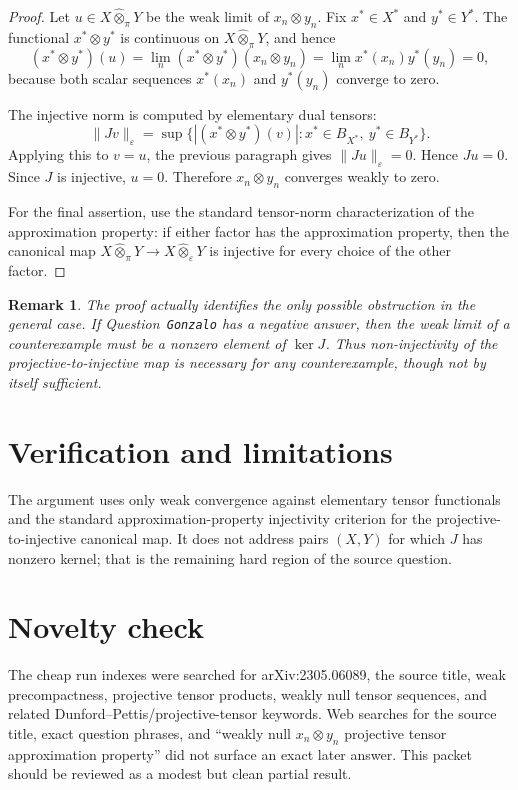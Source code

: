 \documentclass[11pt]{article}
\newtheorem{remark}{Remark}
\newcommand{\pten}{\widehat{\otimes}_{\pi}}
\newcommand{\eten}{\widehat{\otimes}_{\varepsilon}}
\begin{document}
\begin{proof}
Let \(u\in X\pten Y\) be the weak limit of \(x_n\otimes y_n\).  Fix \(x^*\in X^*\) and \(y^*\in Y^*\).  The functional \(x^*\otimes y^*\) is continuous on \(X\pten Y\), and hence
\[
  (x^*\otimes y^*)(u)
  =\lim_n (x^*\otimes y^*)(x_n\otimes y_n)
  =\lim_n x^*(x_n)y^*(y_n)
  =0,
\]
because both scalar sequences \(x^*(x_n)\) and \(y^*(y_n)\) converge to zero.

The injective norm is computed by elementary dual tensors:
\[
  \|Jv\|_{\varepsilon}
  =
  \sup\big\{ |(x^*\otimes y^*)(v)|:
       x^*\in B_{X^*},\ y^*\in B_{Y^*}\big\}.
\]
Applying this to \(v=u\), the previous paragraph gives \(\|Ju\|_{\varepsilon}=0\).  Hence \(Ju=0\).  Since \(J\) is injective, \(u=0\).  Therefore \(x_n\otimes y_n\) converges weakly to zero.

For the final assertion, use the standard tensor-norm characterization of the approximation property: if either factor has the approximation property, then the canonical map \(X\pten Y\to X\eten Y\) is injective for every choice of the other factor.
\end{proof}

\begin{remark}
The proof actually identifies the only possible obstruction in the general case.  If Question~\texttt{Gonzalo} has a negative answer, then the weak limit of a counterexample must be a nonzero element of \(\ker J\).  Thus non-injectivity of the projective-to-injective map is necessary for any counterexample, though not by itself sufficient.
\end{remark}

\section*{Verification and limitations}

The argument uses only weak convergence against elementary tensor functionals and the standard approximation-property injectivity criterion for the projective-to-injective canonical map.  It does not address pairs \((X,Y)\) for which \(J\) has nonzero kernel; that is the remaining hard region of the source question.

\section*{Novelty check}

The cheap run indexes were searched for arXiv:2305.06089, the source title, weak precompactness, projective tensor products, weakly null tensor sequences, and related Dunford--Pettis/projective-tensor keywords.  Web searches for the source title, exact question phrases, and ``weakly null \(x_n\otimes y_n\) projective tensor approximation property'' did not surface an exact later answer.  This packet should be reviewed as a modest but clean partial result.
\end{document}
